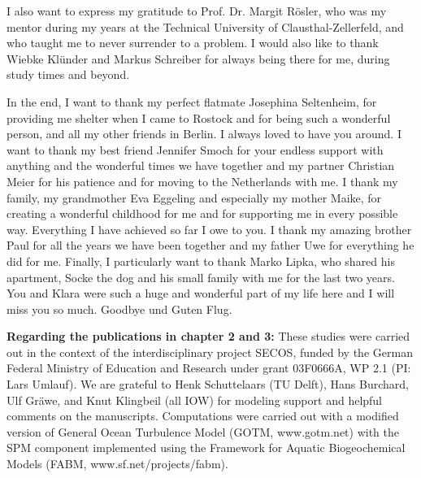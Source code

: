 I also want to express my gratitude to Prof. Dr. Margit Rösler, who was my 
mentor during my years at the Technical University of Clausthal-Zellerfeld, and 
who taught me to never surrender to a problem. I would also like to thank 
Wiebke Klünder and Markus Schreiber for always being there for me, during study 
times and beyond.

In the end, I want to thank my perfect flatmate Josephina Seltenheim, for 
providing me shelter when I came to Rostock and for being such a wonderful 
person, and all my other friends in Berlin. I always loved to have you around. 
I want to thank my best friend Jennifer Smoch for your endless support with 
anything and the wonderful times we have together and my partner Christian 
Meier for his patience and for moving to the Netherlands with me. I thank my 
family, my grandmother Eva Eggeling and especially my mother Maike, 
for creating a wonderful childhood for me and for supporting me in every 
possible way. Everything I have achieved so far I owe to you. I thank my amazing 
brother Paul for all the years we have been together and my father Uwe for 
everything he did for me. Finally, I particularly want to thank Marko 
Lipka, who shared his apartment, Socke the dog and his small family with me for 
the last two years. You and Klara were such a huge and wonderful part of my 
life here and I will miss you so much. Goodbye und Guten Flug. 

\textbf{Regarding the publications in chapter 2 and 3:} These studies were 
carried out in the context of the interdisciplinary project SECOS, funded by the 
German Federal Ministry of Education and Research under grant 03F0666A, WP 2.1 
(PI: Lars Umlauf). We are grateful to Henk Schuttelaars (TU Delft), Hans
Burchard, Ulf Gr{\"a}we, and Knut Klingbeil (all IOW) for modeling
support and helpful comments on the manuscripts. Computations were
carried out with a modified version of General Ocean Turbulence Model
(GOTM, www.gotm.net) with the SPM component implemented using the
Framework for Aquatic Biogeochemical Models (FABM,
www.sf.net/projects/fabm).

\newpage

\tableofcontents
